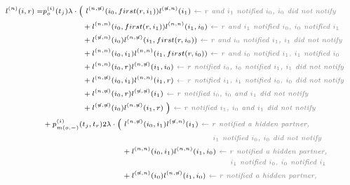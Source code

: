 \documentclass[a4paper,10pt]{article}
\begin{document}
 
\begin{equation}
\scriptsize
\begin{split}
l^{(n)}(i, r) = &p_o^{(i)}(t_j) \lambda \cdot
\Big(~l^{(n,\not{n})}(i_0,first(r,i_1))l^{(\not{n},n)}(i_1) \textit{\color{gray}~$\leftarrow$ $r$ and $i_1$ notified $i_0$, $i_0$ did not notify} \\
&~~~~~~~~~~~~~~~+ l^{(n,n)}(i_0,first(r,i_1))l^{(n,n)}(i_1, i_0) \textit{\color{gray}~$\leftarrow$ $r$ and $i_1$ notified $i_0$, $i_0$ notified $i_1$} \\
&~~~~~~~~~~~~~~~+l^{(\not{n},n)}(i_0)l^{(n,\not{n})}(i_1,first(r,i_0)) \textit{\color{gray}~$\leftarrow$ $r$ and $i_0$ notified $i_1$, $i_1$ did not notify} \\
&~~~~~~~~~~~~~~~+ l^{(n,n)}(i_0, i_1)l^{(n,n)}(i_1,first(r,i_0)) \textit{\color{gray}~$\leftarrow$ $r$ and $i_0$ notified $i_1$, $i_1$ notified $i_0$} \\
&~~~~~~~~~~~~~~~+l^{(n,n)}(i_0,r)l^{(n,\not{n})}(i_1, i_0) \textit{\color{gray}~$\leftarrow$ $r$ notified $i_0$, $i_0$ notified $i_1$, $i_1$ did not notify} \\
&~~~~~~~~~~~~~~~+ l^{(n,\not{n})}(i_0, i_1)l^{(n,n)}(i_1,r) \textit{\color{gray}~$\leftarrow$ $r$ notified $i_1$, $i_1$ notified $i_0$, $i_0$ did not notify} \\
&~~~~~~~~~~~~~~~+l^{(n,\not{n})}(i_0,r)l^{(\not{n},\not{n})}(i_1) \textit{\color{gray}~$\leftarrow$ $r$ notified $i_0$, $i_0$ and $i_1$ did not notify} \\
&~~~~~~~~~~~~~~~+ l^{(\not{n},\not{n})}(i_0)l^{(n,\not{n})}(i_1,r)~\Big) \textit{\color{gray}~$\leftarrow$ $r$ notified $i_1$, $i_0$ and $i_1$ did not notify} 
\\
&+ p_{m(o,-)}^{(i)}(t_j,t_r) 2 \lambda \cdot
\Big(~l^{(n,\not{n})}(i_0,i_1)l^{(\not{n},n)}(i_1) \textit{\color{gray}~$\leftarrow$ $r$ notified a hidden partner,} \\
&\textit{\color{gray}~~~~~~~~~~~~~~~~~~~~~~~~~~~~~~~~~~~~~~~~~~~~~~~~~~~~~~~~~~$i_1$ notified $i_0$, $i_0$ did not notify} \\
&~~~~~~~~~~~~~~~~~~~~~~~~~~~~~~+ l^{(n,n)}(i_0,i_1)l^{(n,n)}(i_1, i_0)\textit{\color{gray}~$\leftarrow$ $r$ notified a hidden partner,} \\
&\textit{\color{gray}~~~~~~~~~~~~~~~~~~~~~~~~~~~~~~~~~~~~~~~~~~~~~~~~~~~~~~~~~~~~~~~~$i_1$ notified $i_0$, $i_0$ notified $i_1$} \\
&~~~~~~~~~~~~~~~~~~~~~~~~~~~~~~+l^{(\not{n},n)}(i_0)l^{(n,\not{n})}(i_1,i_0) \textit{\color{gray}~$\leftarrow$ $r$ notified a hidden partner,} \\

\end{split}
\end{equation}
\end{document}
